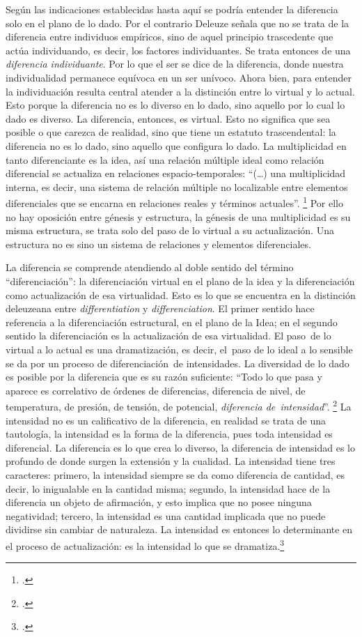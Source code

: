 Según las indicaciones establecidas hasta aquí se podría entender la diferencia solo en el plano de lo dado. Por el contrario Deleuze señala que no se trata de la diferencia entre individuos empíricos, sino de aquel principio trascedente que actúa individuando, es decir, los factores individuantes. Se trata entonces de una \emph{diferencia individuante}. Por lo que el ser se dice de la diferencia, donde nuestra individualidad permanece equívoca en un ser unívoco. Ahora bien, para entender la individuación resulta central atender a la distinción entre lo virtual y lo actual. Esto porque la diferencia no es lo diverso en lo dado, sino aquello por lo cual lo dado es diverso. La diferencia, entonces, es virtual. Esto no significa que sea posible o que carezca de realidad, sino que tiene un estatuto trascendental: la diferencia no es lo dado, sino aquello que configura lo dado. La multiplicidad en tanto diferenciante es la idea, así una relación múltiple ideal como relación diferencial se actualiza en relaciones espacio-temporales: \enquote{(\ldots) una multiplicidad interna, es decir, una sistema de relación múltiple no localizable entre elementos diferenciales que se encarna en relaciones  \linebreak reales y términos actuales}. \footcite[278]{@6961-DELEUZE2002} Por ello no hay oposición entre génesis y estructura, la génesis de una multiplicidad es su misma estructura, se trata solo del paso de lo virtual a su actualización. Una estructura no es sino un sistema de relaciones y elementos diferenciales.

La diferencia se comprende atendiendo al doble sentido del término \enquote{diferenciación}: la diferenciación virtual en el plano de la idea y la diferenciación como actualización de esa virtualidad. Esto es lo que se encuentra en la distinción deleuzeana entre \emph{differentiation} y \emph{differenciation}. El primer sentido hace referencia a la diferenciación estructural, en el plano de la Idea; en el segundo sentido la diferenciación es la actualización de esa virtualidad. El paso~de lo virtual a lo actual es una dramatización, es decir, el~paso de lo ideal a lo sensible se da por un proceso de diferenciación~de intensidades. La diversidad de lo dado es posible por la diferencia que es su razón suficiente: \enquote{Todo lo que pasa y aparece es correlativo de órdenes de diferencias, diferencia de nivel, de temperatura, de presión, de tensión, de potencial, \emph{diferencia de~intensidad}}. \footcite[333]{@6961-DELEUZE2002} La intensidad no es un calificativo de la diferencia, en realidad se trata de una tautología, la intensidad es la forma de la diferencia, pues toda intensidad es diferencial. La diferencia es lo que crea lo diverso, la diferencia de intensidad es lo profundo de donde surgen la extensión y la cualidad. La intensidad tiene tres caracteres: primero, la intensidad siempre se da como diferencia de cantidad, es decir, lo inigualable en la cantidad misma; segundo, la intensidad hace de la diferencia un objeto de afirmación, y esto implica que no posee ninguna negatividad; tercero, la intensidad es una cantidad implicada que no puede dividirse sin cambiar de naturaleza. La intensidad es entonces lo determinante en el proceso de actualización: es la intensidad lo que se dramatiza.\footcite{@6980-DELEUZE2005}

